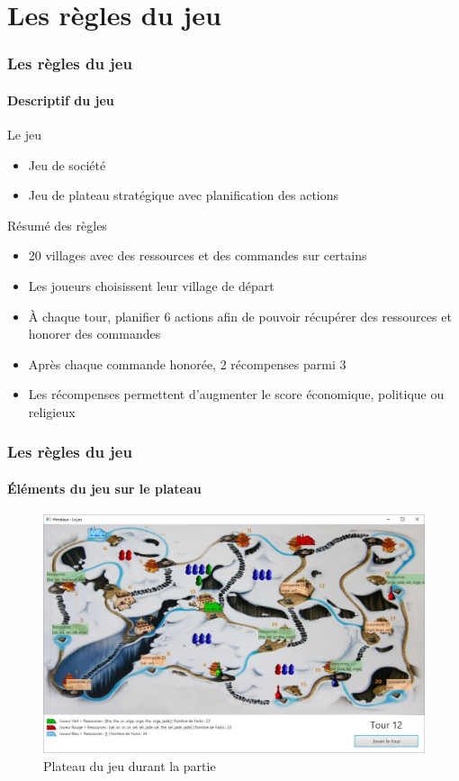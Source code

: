 \section{Les règles du jeu}

	\begin{frame}
	\frametitle{Les règles du jeu}
	\framesubtitle{Descriptif du jeu}
	
	\begin{block}{Le jeu}
		\begin{itemize}
			\item Jeu de société
			\item Jeu de plateau stratégique avec planification des actions
		\end{itemize}
	\end{block}
	
	\begin{block}{Résumé des règles}
		\begin{itemize}
			\item 20 villages avec des ressources et des commandes sur certains
			\item Les joueurs choisissent leur village de départ
			\item À chaque tour, planifier 6 actions afin de pouvoir récupérer des ressources et honorer des commandes
			\item Après chaque commande honorée, 2 récompenses parmi 3
			\item Les récompenses permettent d'augmenter le score économique, politique ou religieux
		\end{itemize}
	\end{block}
	
	\end{frame}


	\begin{frame}
		\frametitle{Les règles du jeu}
		\framesubtitle{Éléments du jeu sur le plateau}
		
		\begin{figure}[h]
		\centering
		\includegraphics[width=1\linewidth]{images/etat_jeu_avance}
		\caption{Plateau du jeu durant la partie}
		\label{fig:plateau}
		\end{figure}
	
	\end{frame}

